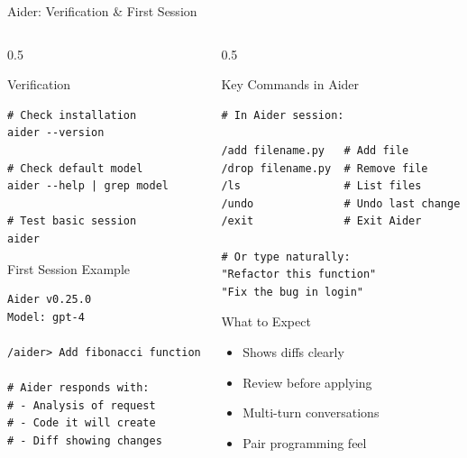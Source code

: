 \documentclass[aspectratio=169,11pt]{beamer}
\begin{document}
\begin{frame}[fragile]{Aider: Verification \& First Session}
    \begin{columns}[T]
        \begin{column}{0.5\textwidth}
            \begin{block}{Verification}
                \begin{lstlisting}[style=bash]
# Check installation
aider --version

# Check default model
aider --help | grep model

# Test basic session
aider
                \end{lstlisting}
            \end{block}

            \begin{block}{First Session Example}
                \begin{lstlisting}[style=bash,numbers=none]
Aider v0.25.0
Model: gpt-4

/aider> Add fibonacci function

# Aider responds with:
# - Analysis of request
# - Code it will create
# - Diff showing changes
                \end{lstlisting}
            \end{block}
        \end{column}
        \begin{column}{0.5\textwidth}
            \begin{exampleblock}{Key Commands in Aider}
                \begin{lstlisting}[style=bash,numbers=none]
# In Aider session:

/add filename.py   # Add file
/drop filename.py  # Remove file
/ls                # List files
/undo              # Undo last change
/exit              # Exit Aider

# Or type naturally:
"Refactor this function"
"Fix the bug in login"
                \end{lstlisting}
            \end{exampleblock}

            \begin{block}{What to Expect}
                \begin{itemize}
                    \item Shows diffs clearly
                    \item Review before applying
                    \item Multi-turn conversations
                    \item Pair programming feel
                \end{itemize}
            \end{block}
        \end{column}
    \end{columns}

\end{frame}
\end{document}
